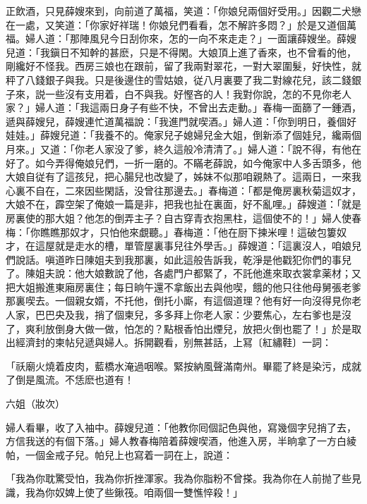 正飲酒，只見薛嫂來到，向前道了萬福，笑道：「你娘兒兩個好受用。」因觀二犬戀在一處，又笑道：「你家好祥瑞！你娘兒們看看，怎不解許多悶？」於是又道個萬福。婦人道：「那陣風兒今日刮你來，怎的一向不來走走？」一面讓薛嫂坐。薛嫂兒道：「我鎭日不知幹的甚麽，只是不得閑。大娘頂上進了香來，也不曾看的他，剛纔好不怪我。西房三娘也在跟前，留了我兩對翠花，一對大翠圍髮，好快性，就秤了八錢銀子與我。只是後邊住的雪姑娘，従八月裏要了我二對線花兒，該二錢銀子來，説一些沒有支用着，白不與我。好慳吝的人！我對你說，怎的不見你老人家？」婦人道：「我這兩日身子有些不快，不曾出去走動。」春梅一面篩了一鍾酒，遞與薛嫂兒，薛嫂連忙道萬福說：「我進門就喫酒。」婦人道：「你到明日，養個好娃娃。」薛嫂兒道：「我養不的。俺家兒子媳婦兒金大姐，倒新添了個娃兒，纔兩個月來。」又道：「你老人家没了爹，終久這般冷清清了。」婦人道：「說不得，有他在好了。如今弄得俺娘兒們，一折一磨的。不瞞老薛說，如今俺家中人多舌頭多，他大娘自従有了這孩兒，把心腸兒也改變了，姊妹不似那咱親熱了。這兩日，一來我心裏不自在，二來因些閑話，没曾往那邊去。」春梅道：「都是俺房裏秋菊這奴才，大娘不在，霹空架了俺娘一篇是非，把我也扯在裏面，好不亂哩。」薛嫂道：「就是房裏使的那大姐？他怎的倒弄主子？自古穿青衣抱黑柱，這個使不的！」婦人使春梅：「你瞧瞧那奴才，只怕他來覷聽。」春梅道：「他在厨下揀米哩！這破包簍奴才，在這屋就是走水的槽，單管屋裏事兒往外學舌。」薛嫂道：「這裏沒人，咱娘兒們說話。嗔道昨日陳姐夫到我那裏，如此這般告訴我，乾淨是他戳犯你們的事兒了。陳姐夫說：他大娘數說了他，各處門户都緊了，不託他進來取衣裳拿薬材；又把大姐搬進東廂房裏住；每日晌午還不拿飯出去與他喫，餓的他只往他母舅張老爹那裏喫去。一個親女婿，不托他，倒托小廝，有這個道理？他有好一向沒得見你老人家，巴巴央及我，捎了個柬兒，多多拜上你老人家：少要焦心，左右爹也是沒了，爽利放倒身大做一做，怕怎的？點根香怕出煙兒，放把火倒也罷了！」於是取出經濟封的柬帖兒遞與婦人。拆開觀看，别無甚話，上冩〔紅繡鞋〕一詞：

\begin{myquote}
「祅廟火燒着皮肉，藍橋水淹過咽喉。緊按納風聲滿南州。畢罷了終是染污，成就了倒是風流。不恁麽也道有！

六姐（妝次）

\end{myquote}

婦人看畢，收了入袖中。薛嫂兒道：「他教你囘個記色與他，寫幾個字兒捎了去，方信我送的有個下落。」婦人教春梅陪着薛嫂喫酒，他進入房，半晌拿了一方白綾帕，一個金戒子兒。帕兒上也寫着一詞在上，說道：

\begin{myquote}
「我為你耽驚受怕，我為你折挫渾家。我為你脂粉不曾搽。我為你在人前抛了些見識，我為你奴婢上使了些鍬筏。咱兩個一雙憔悴殺！」
\end{myquote}

